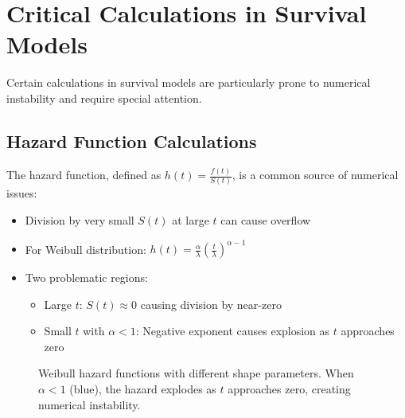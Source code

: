 \section{Critical Calculations in Survival Models}

Certain calculations in survival models are particularly prone to numerical instability and require special attention.

\subsection{Hazard Function Calculations}

The hazard function, defined as $h(t) = \frac{f(t)}{S(t)}$, is a common source of numerical issues:

\begin{itemize}
    \item Division by very small $S(t)$ at large $t$ can cause overflow
    \item For Weibull distribution: $h(t) = \frac{\alpha}{\lambda}\left(\frac{t}{\lambda}\right)^{\alpha-1}$
    \item Two problematic regions:
    \begin{itemize}
        \item Large $t$: $S(t) \approx 0$ causing division by near-zero
        \item Small $t$ with $\alpha < 1$: Negative exponent causes explosion as $t$ approaches zero
    \end{itemize}
\end{itemize}

\begin{figure}[htbp]
    \centering
    \caption{Weibull hazard functions with different shape parameters. When $\alpha < 1$ (blue), the hazard explodes as $t$ approaches zero, creating numerical instability.}
    \label{fig:weibull-hazards}
\end{figure}

